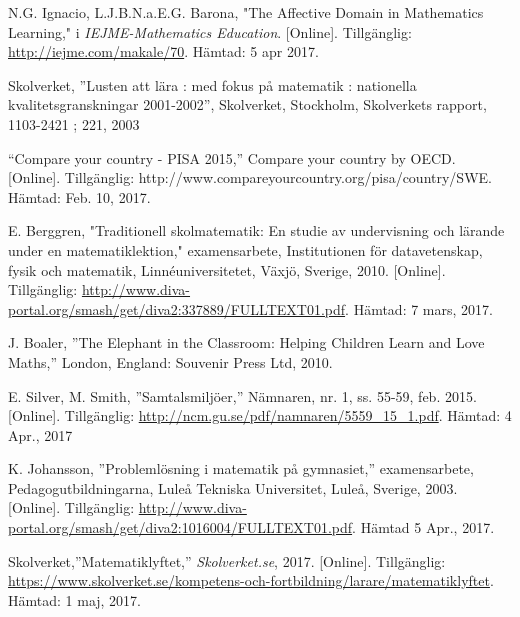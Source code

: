     N.G. Ignacio, L.J.B.N.a.E.G. Barona, "The Affective Domain in Mathematics Learning," i \textsl{IEJME-Mathematics Education}. [Online]. Tillgänglig: \url{http://iejme.com/makale/70}. Hämtad: 5 apr 2017.
    
    Skolverket, ''Lusten att l{\"a}ra : med fokus p{\aa} matematik : nationella kvalitetsgranskningar 2001-2002'',  Skolverket, Stockholm, Skolverkets rapport, 1103-2421 ; 221, 2003
    
   
    
    “Compare your country - PISA 2015,” Compare your country by OECD. [Online]. Tillgänglig: http://www.compareyourcountry.org/pisa/country/SWE. Hämtad: Feb. 10, 2017.
    
    E. Berggren, "Traditionell skolmatematik: En studie av undervisning och lärande under en matematiklektion," examensarbete, Institutionen för datavetenskap, fysik och matematik, Linnéuniversitetet, Växjö, Sverige, 2010. [Online]. Tillgänglig: \url{http://www.diva-portal.org/smash/get/diva2:337889/FULLTEXT01.pdf}. Hämtad: 7 mars, 2017.
    
    J. Boaler, ''The Elephant in the Classroom: Helping Children Learn and Love Maths,'' 
    London,
    England: Souvenir Press Ltd, 
    2010. 
    
    E. Silver, M. Smith, ''Samtalsmiljöer,'' Nämnaren, nr. 1, ss. 55-59, feb. 2015. [Online]. Tillgänglig: \url{http://ncm.gu.se/pdf/namnaren/5559_15_1.pdf}. Hämtad: 4 Apr., 2017
    
    K. Johansson, ''Problemlösning i matematik på gymnasiet,'' examensarbete, Pedagogutbildningarna, Luleå Tekniska Universitet, Luleå, Sverige, 2003. [Online]. Tillgänglig: \url{http://www.diva-portal.org/smash/get/diva2:1016004/FULLTEXT01.pdf}. Hämtad 5 Apr., 2017.
    
    Skolverket,''Matematiklyftet,'' \textsl{Skolverket.se}, 2017. [Online]. Tillgänglig: \url{https://www.skolverket.se/kompetens-och-fortbildning/larare/matematiklyftet}. Hämtad: 1 maj, 2017.
    
